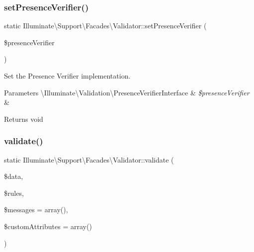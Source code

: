 \subsubsection{\texorpdfstring{set\+Presence\+Verifier()}{setPresenceVerifier()}}
{\footnotesize\ttfamily static Illuminate\textbackslash{}\+Support\textbackslash{}\+Facades\textbackslash{}\+Validator\+::set\+Presence\+Verifier (\begin{DoxyParamCaption}\item[{}]{\$presence\+Verifier }\end{DoxyParamCaption})\hspace{0.3cm}{\ttfamily [static]}}

Set the Presence Verifier implementation.


\begin{DoxyParams}[1]{Parameters}
\textbackslash{}\+Illuminate\textbackslash{}\+Validation\textbackslash{}\+Presence\+Verifier\+Interface & {\em \$presence\+Verifier} & \\
\hline
\end{DoxyParams}
\begin{DoxyReturn}{Returns}
void 
\end{DoxyReturn}
\mbox{\label{class_illuminate_1_1_support_1_1_facades_1_1_validator_ada312162486fd32605e929f0adbd159b}} 
\subsubsection{\texorpdfstring{validate()}{validate()}}
{\footnotesize\ttfamily static Illuminate\textbackslash{}\+Support\textbackslash{}\+Facades\textbackslash{}\+Validator\+::validate (\begin{DoxyParamCaption}\item[{}]{\$data,  }\item[{}]{\$rules,  }\item[{}]{\$messages = {\ttfamily array()},  }\item[{}]{\$custom\+Attributes = {\ttfamily array()} }\end{DoxyParamCaption})\hspace{0.3cm}{\ttfamily [static]}}

